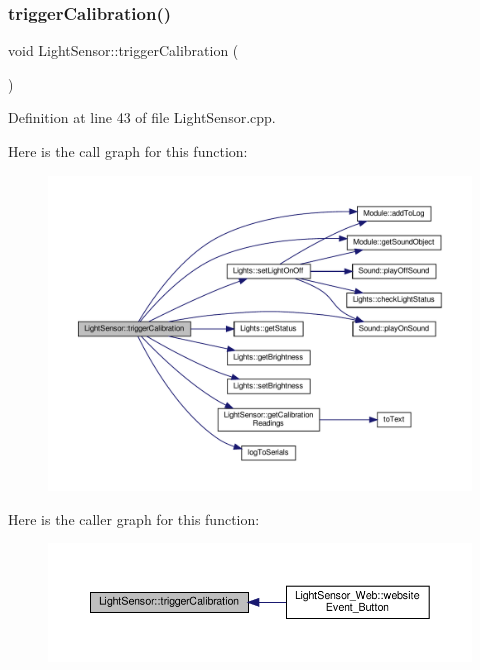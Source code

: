 \mbox{\label{class_light_sensor_a50559883ebb2c80a5d2144a6453bd1c3}} 
\subsubsection{\texorpdfstring{trigger\+Calibration()}{triggerCalibration()}\hspace{0.1cm}{\footnotesize\ttfamily [2/2]}}
{\footnotesize\ttfamily void Light\+Sensor\+::trigger\+Calibration (\begin{DoxyParamCaption}{ }\end{DoxyParamCaption})}



Definition at line 43 of file Light\+Sensor.\+cpp.

Here is the call graph for this function\+:
\nopagebreak
\begin{figure}[H]
\begin{center}
\leavevmode
\includegraphics[width=350pt]{class_light_sensor_a50559883ebb2c80a5d2144a6453bd1c3_cgraph}
\end{center}
\end{figure}
Here is the caller graph for this function\+:
\nopagebreak
\begin{figure}[H]
\begin{center}
\leavevmode
\includegraphics[width=350pt]{class_light_sensor_a50559883ebb2c80a5d2144a6453bd1c3_icgraph}
\end{center}
\end{figure}



